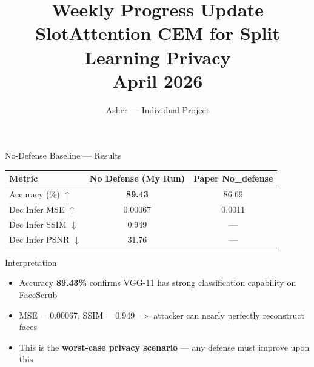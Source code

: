\documentclass[aspectratio=169, 10pt]{beamer}
\title[Weekly Update]{\textbf{Weekly Progress Update}\\[0.2cm]
{\normalsize SlotAttention CEM for Split Learning Privacy}\\[0.1cm]
{\small April 2026}}
\author{Asher --- Individual Project}
\date{}
\newcommand{\bad}[1]{\textcolor{paramred}{#1}}
\begin{document}
\begin{frame}{No-Defense Baseline --- Results}

\begin{center}
\renewcommand{\arraystretch}{1.3}
\begin{tabular}{l c c}
\toprule
\textbf{Metric} & \textbf{No Defense (My Run)} & \textbf{Paper No\_defense} \\
\midrule
Accuracy (\%) $\uparrow$ & \textbf{89.43} & 86.69 \\
\hdashline
Dec Infer MSE $\uparrow$ & 0.00067 & 0.0011 \\
Dec Infer SSIM $\downarrow$ & 0.949 & --- \\
Dec Infer PSNR $\downarrow$ & 31.76 & --- \\
\bottomrule
\end{tabular}
\end{center}

\vspace{0.3cm}

\begin{alertblock}{Interpretation}
\begin{itemize}\small
    \item Accuracy \textbf{89.43\%} confirms VGG-11 has strong classification capability on FaceScrub
    \item MSE = 0.00067, SSIM = 0.949 $\Rightarrow$ attacker can \bad{nearly perfectly reconstruct} faces
    \item This is the \textbf{worst-case privacy scenario} --- any defense must improve upon this
\end{itemize}
\end{alertblock}

\end{frame}
\end{document}
